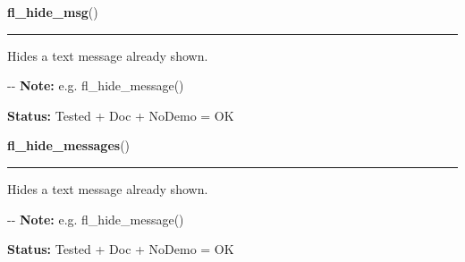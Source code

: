     \label{xformslib:flgoodies:fl_hide_message}

    \vspace{0.5ex}

\hspace{.8\funcindent}\begin{boxedminipage}{\funcwidth}

    \raggedright \textbf{fl\_hide\_msg}()

    \vspace{-1.5ex}

    \rule{\textwidth}{0.5\fboxrule}
\setlength{\parskip}{2ex}

Hides a text message already shown.

-{}-
\setlength{\parskip}{1ex}
\textbf{Note:} 
e.g. fl\_hide\_message()


\textbf{Status:} 
Tested + Doc + NoDemo = OK


    \end{boxedminipage}

    \label{xformslib:flgoodies:fl_hide_message}

    \vspace{0.5ex}

\hspace{.8\funcindent}\begin{boxedminipage}{\funcwidth}

    \raggedright \textbf{fl\_hide\_messages}()

    \vspace{-1.5ex}

    \rule{\textwidth}{0.5\fboxrule}
\setlength{\parskip}{2ex}

Hides a text message already shown.

-{}-
\setlength{\parskip}{1ex}
\textbf{Note:} 
e.g. fl\_hide\_message()


\textbf{Status:} 
Tested + Doc + NoDemo = OK


    \end{boxedminipage}

    \label{xformslib:flgoodies:fl_show_question}

    \vspace{0.5ex}

